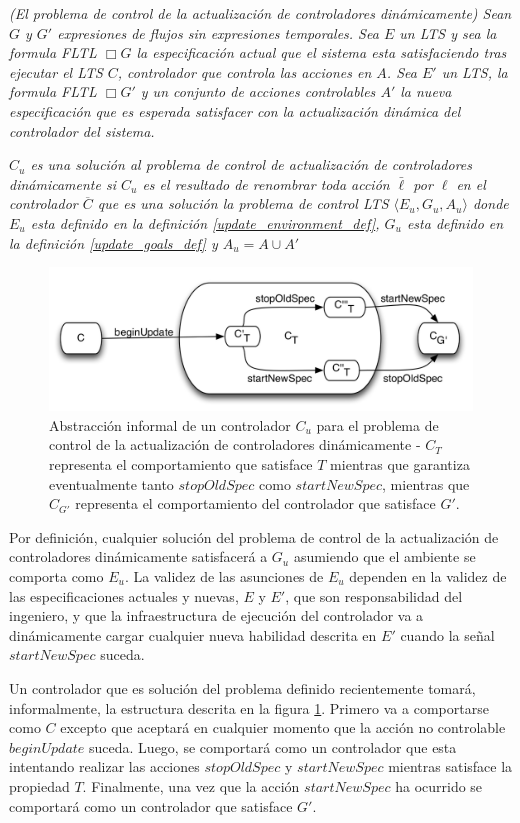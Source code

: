 \begin{nahaDef}
\emph{(El problema de control de la actualización de controladores dinámicamente) Sean $G$ y $G'$ expresiones de flujos
sin expresiones temporales. Sea $E$ un LTS y sea la formula FLTL $\Box G$ la especificación actual que el sistema esta
satisfaciendo tras ejecutar el LTS $C$, controlador que controla las acciones en $A$. Sea $E'$ un LTS, la formula FLTL
$\Box G'$ y un conjunto de acciones controlables $A'$ la nueva especificación que es esperada satisfacer con la
actualización dinámica del controlador del sistema.}

\emph{$C_u$ es una solución al problema de control de actualización de controladores dinámicamente si $C_u$ es el resultado de
renombrar toda acción $\bar{\ell}$ por $\ell$ en el controlador $\overline{C}$ que es una solución la problema de
control LTS $\langle E_u, G_u, A_u \rangle$ donde $E_u$ esta definido en la definición \ref{update_environment_def},
$G_u$ esta definido en la definición \ref{update_goals_def} y $A_u = A \cup A'$}
\end{nahaDef}

\begin{figure}
\centering
\includegraphics[scale=0.35]{img/C_u.png}
\caption{Abstracción informal de un controlador $C_u$ para el problema de control de la actualización de controladores
dinámicamente - $C_T$ representa el comportamiento que satisface $T$ mientras que garantiza eventualmente tanto
$stopOldSpec$ como $startNewSpec$, mientras que $C_{G'}$ representa el comportamiento del controlador que satisface
$G'$.}
\label{update_controller}
\end{figure}

Por definición, cualquier solución del problema de control de la actualización de controladores dinámicamente
satisfacerá a $G_u$ asumiendo que el ambiente se comporta como $E_u$. La validez de las asunciones de $E_u$ dependen en
la validez de las especificaciones actuales y nuevas, $E$ y $E'$, que son responsabilidad del ingeniero, y que la
infraestructura de ejecución del controlador va a dinámicamente cargar cualquier nueva habilidad descrita en $E'$ cuando
la señal $startNewSpec$ suceda.

Un controlador que es solución del problema definido recientemente tomará, informalmente, la estructura descrita en la
figura \ref{update_controller}. Primero va a comportarse como $C$ excepto que aceptará en cualquier momento que la acción no controlable
$beginUpdate$ suceda. Luego, se comportará como un controlador que esta intentando realizar las acciones $stopOldSpec$ y
$startNewSpec$ mientras satisface la propiedad $T$. Finalmente, una vez que la acción $startNewSpec$ ha ocurrido se
comportará como un controlador que satisface $G'$.


